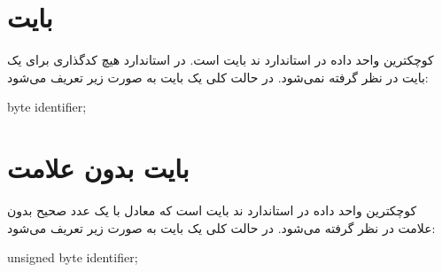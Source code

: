 
\section{بایت}

کوچکترین واحد داده در استاندارد ند بایت است. در استاندارد هیچ کدگذاری برای یک
بایت در نظر گرفته نمی‌شود.
در حالت کلی یک بایت به صورت زیر تعریف می‌شود:

\begin{C++}
byte identifier;
\end{C++}

\section{بایت بدون علامت}

کوچکترین واحد داده در استاندارد ند بایت است که معادل با یک عدد صحیح بدون علامت
در نظر گرفته می‌شود.
در حالت کلی یک بایت به صورت زیر تعریف می‌شود:

\begin{C++}
unsigned byte identifier;
\end{C++}

